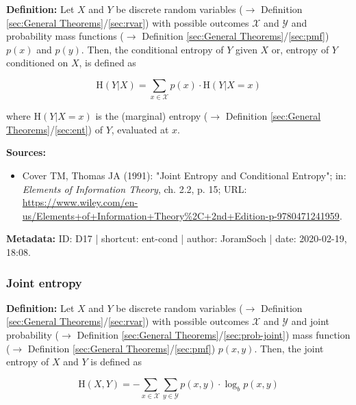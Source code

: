 \documentclass[a4paper,12pt,twoside]{book}
\begin{document}
\textbf{Definition:} Let $X$ and $Y$ be discrete random variables ($\rightarrow$ Definition \ref{sec:General Theorems}/\ref{sec:rvar}) with possible outcomes $\mathcal{X}$ and $\mathcal{Y}$ and probability mass functions ($\rightarrow$ Definition \ref{sec:General Theorems}/\ref{sec:pmf}) $p(x)$ and $p(y)$. Then, the conditional entropy of $Y$ given $X$ or, entropy of $Y$ conditioned on $X$, is defined as

\begin{equation} \label{eq:ent-cond-ent-cond}
\mathrm{H}(Y|X) = \sum_{x \in \mathcal{X}} p(x) \cdot \mathrm{H}(Y|X=x)
\end{equation}

where $\mathrm{H}(Y \vert X=x)$ is the (marginal) entropy ($\rightarrow$ Definition \ref{sec:General Theorems}/\ref{sec:ent}) of $Y$, evaluated at $x$.


\vspace{1em}
\textbf{Sources:}
\begin{itemize}
\item Cover TM, Thomas JA (1991): "Joint Entropy and Conditional Entropy"; in: \textit{Elements of Information Theory}, ch. 2.2, p. 15; URL: \url{https://www.wiley.com/en-us/Elements+of+Information+Theory%2C+2nd+Edition-p-9780471241959}.
\end{itemize}


\vspace{1em}
\textbf{Metadata:} ID: D17 | shortcut: ent-cond | author: JoramSoch | date: 2020-02-19, 18:08.
\vspace{1em}



\subsubsection[\textit{Joint entropy}]{Joint entropy} \label{sec:ent-joint}
\setcounter{equation}{0}

\textbf{Definition:} Let $X$ and $Y$ be discrete random variables ($\rightarrow$ Definition \ref{sec:General Theorems}/\ref{sec:rvar}) with possible outcomes $\mathcal{X}$ and $\mathcal{Y}$ and joint probability ($\rightarrow$ Definition \ref{sec:General Theorems}/\ref{sec:prob-joint}) mass function ($\rightarrow$ Definition \ref{sec:General Theorems}/\ref{sec:pmf}) $p(x,y)$. Then, the joint entropy of $X$ and $Y$ is defined as

\begin{equation} \label{eq:ent-joint-ent-joint}
\mathrm{H}(X,Y) = - \sum_{x \in \mathcal{X}} \sum_{y \in \mathcal{Y}} p(x,y) \cdot \log_b p(x,y)
\end{equation}
\end{document}

